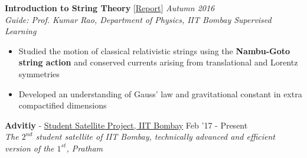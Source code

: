 \documentclass[10pt]{article}%
\newcommand{\xfilll}[2][1ex]{
\dimen0=#2\advance\dimen0 by #1
\leaders\hrule height \dimen0 depth -#1\hfill}
\begin{document}
{{\flushleft \bf \large{Introduction to String Theory}}   [\href{https://drive.google.com/open?id=17nGZUU5NiGIUHM8Fuh9vPvQnRwILx0PW}{Report}]  \hfill \textit{Autumn 2016} \\
{\em Guide: Prof. Kumar Rao, Department of Physics, IIT Bombay \hfill Supervised Learning}
\vspace{-1.5mm}
\begin{itemize}
\setlength\itemsep{0.01em}
    \item Studied the motion of classical relativistic strings using the \textbf{Nambu-Goto string action} and conserved currents arising from translational and Lorentz symmetries
    \item Developed an understanding of Gauss’ law and gravitational constant in extra compactified dimensions
\end{itemize}
{\flushleft  \large{\textbf{Advitiy} - \href{https://www.aero.iitb.ac.in/satlab/}{Student Satellite Project, IIT Bombay}}}  \hfill {{{Feb '17 - Present}}} \\
{\em The $\mathit{2^{nd}}$ student satellite of IIT Bombay, technically advanced and efficient version of the $\mathit{1^{st}}$, Pratham} 

}
\end{document}
